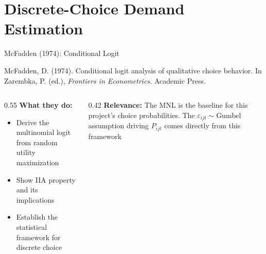 \documentclass[aspectratio=169,professionalfonts]{beamer}
\newcommand{\hl}[1]{\textbf{\textcolor{UGARed}{#1}}}
\begin{document}
\section{Discrete-Choice Demand Estimation}

\begin{frame}{McFadden (1974): Conditional Logit}
  \begin{tcolorbox}[colback=red!5!white, colframe=UGARed, title=\textbf{Citation}]
    McFadden, D. (1974). Conditional logit analysis of qualitative choice behavior.
    In Zarembka, P. (ed.), \textit{Frontiers in Econometrics}. Academic Press.
  \end{tcolorbox}
  \vspace{6pt}
  \begin{columns}[T]
    \begin{column}{0.55\textwidth}
      \hl{What they do:}
      \begin{itemize}
        \item Derive the multinomial logit from random utility maximization
        \item Show IIA property and its implications
        \item Establish the statistical framework for discrete choice
      \end{itemize}
    \end{column}
    \begin{column}{0.42\textwidth}
      \hl{Relevance:} The MNL is the baseline for this project's choice probabilities.
      The $\varepsilon_{ijt} \sim \text{Gumbel}$ assumption driving $P_{ijt}$ comes
      directly from this framework
    \end{column}
  \end{columns}
\end{frame}
\end{document}

